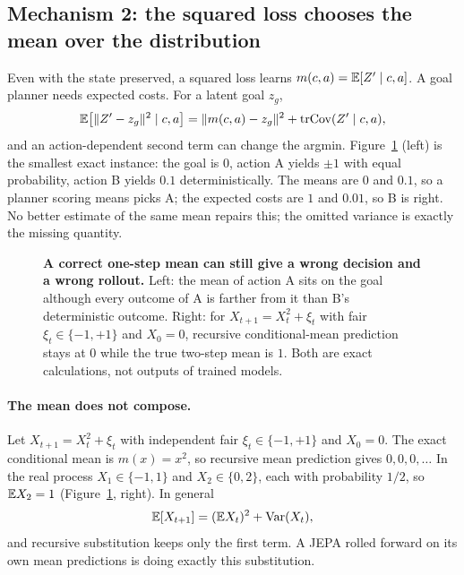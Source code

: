 \subsection{Mechanism 2: the squared loss chooses the mean over the distribution}
\label{sec:variance-example}

Even with the state preserved, a squared loss learns $m(c,a)=\mathbb{E}[Z'\mid c,a]$. A goal planner needs
expected costs. For a latent goal $z_g$,
\begin{equation}
\label{eq:variance-cost}
\mathbb{E}\!\left[\|Z'-z_g\|^2\mid c,a\right]=\|m(c,a)-z_g\|^2+\mathrm{tr}\mathrm{Cov}(Z'\mid c,a),
\end{equation}
and an action-dependent second term can change the argmin. Figure~\ref{fig:concepts} (left) is the
smallest exact instance: the goal is $0$, action A yields $\pm1$ with equal probability, action B
yields $0.1$ deterministically. The means are $0$ and $0.1$, so a planner scoring means picks A;
the expected costs are $1$ and $0.01$, so B is right. No better estimate of the same mean repairs
this; the omitted variance is exactly the missing quantity.

\begin{figure}[t]
\centering
{}
\caption{\textbf{A correct one-step mean can still give a wrong decision and a wrong rollout.}
Left: the mean of action A sits on the goal although every outcome of A is farther from it than
B's deterministic outcome. Right: for $X_{t+1}=X_t^2+\xi_t$ with fair $\xi_t\in\{-1,+1\}$ and
$X_0=0$, recursive conditional-mean prediction stays at $0$ while the true two-step mean is $1$.
Both are exact calculations, not outputs of trained models.}
\label{fig:concepts}
\end{figure}

\paragraph{The mean does not compose.}
Let $X_{t+1}=X_t^2+\xi_t$ with independent fair $\xi_t\in\{-1,+1\}$ and $X_0=0$. The exact
conditional mean is $m(x)=x^2$, so recursive mean prediction gives $0,0,0,\dots$ In the real
process $X_1\in\{-1,1\}$ and $X_2\in\{0,2\}$, each with probability $1/2$, so $\mathbb{E} X_2=1$
(Figure~\ref{fig:concepts}, right). In general
\begin{equation}
\label{eq:mean-recursion}
\mathbb{E}[X_{t+1}]=(\mathbb{E} X_t)^2+\mathrm{Var}(X_t),
\end{equation}
and recursive substitution keeps only the first term. A JEPA rolled forward on its own mean
predictions is doing exactly this substitution.

